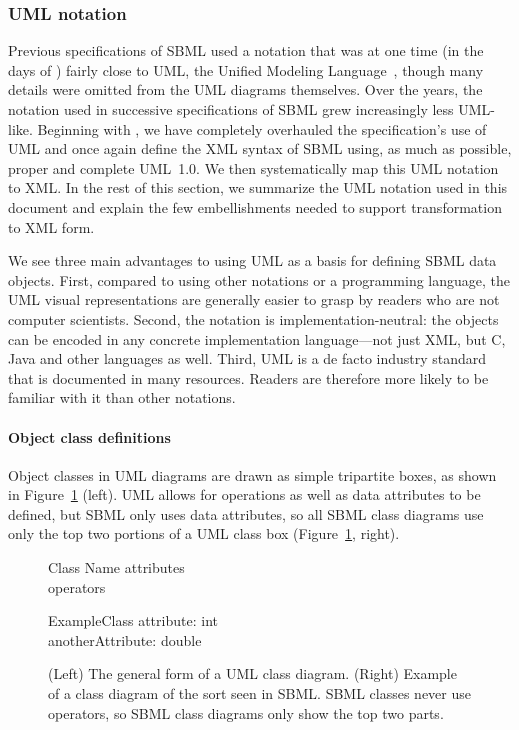 \subsubsection{UML notation}
\label{sec:notation-uml}


Previous specifications of SBML used a notation that was at one
time (in the days of \sbmlone) fairly close to UML, the Unified
Modeling Language~\citep{eriksson:1998,oestereich:1999}, though
many details were omitted from the UML diagrams themselves.  Over
the years, the notation used in successive specifications of SBML
grew increasingly less UML-like.  Beginning with \sbmltwothree, we
have completely overhauled the specification's use of UML and once
again define the XML syntax of SBML using, as much as possible,
proper and complete UML~1.0.  We then systematically map this UML
notation to XML.  In the rest of this section, we summarize the
UML notation used in this document and explain the few
embellishments needed to support transformation to XML form.

We see three main advantages to using UML as a basis for defining
SBML data objects.  First, compared to using other notations or
a programming language, the UML visual representations are
generally easier to grasp by readers who are not computer
scientists.  Second, the notation is implementation-neutral: the
objects can be encoded in any concrete implementation
language---not just XML, but C, Java and other languages as well.
Third, UML is a de facto industry standard that is documented in
many resources.  Readers are therefore more likely to be familiar
with it than other notations.


\paragraph{Object class definitions}

Object classes in UML diagrams are drawn as simple tripartite
boxes, as shown in Figure~\ref{fig:simple-class-eg} (left).  UML
allows for operations as well as data attributes to be defined,
but SBML only uses data attributes, so all SBML class diagrams use
only the top two portions of a UML class box
(Figure~\ref{fig:simple-class-eg}, right).

\begin{figure}[htb]
  \centering
  \small
  \begin{classbox}{Class Name}
    attributes\\
    \hline
    operators\\
  \end{classbox}
  \quad  \quad  \quad  \quad
  \begin{classbox}{ExampleClass}
    attribute: int \\
    anotherAttribute: double\\
  \end{classbox}
  \caption{(Left) The general form of a UML class
      diagram.  (Right) Example of a class diagram of the sort
      seen in SBML.  SBML classes never use operators, so SBML
      class diagrams only show the top two parts.}
  \label{fig:simple-class-eg}
\end{figure}

